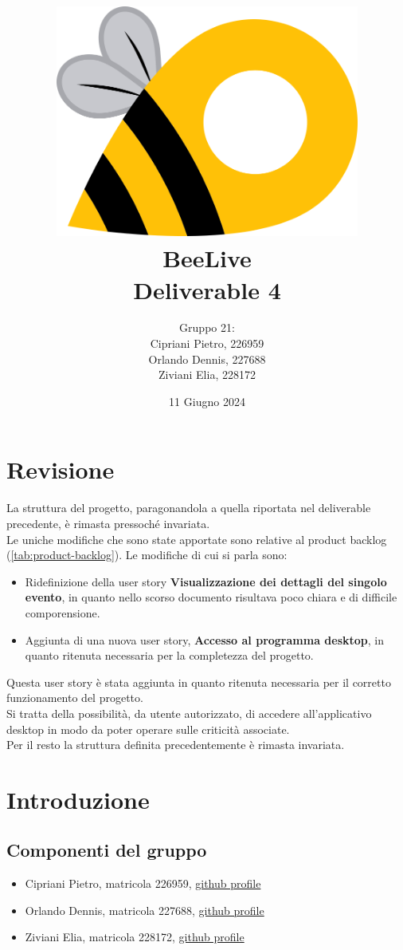 \documentclass{article}
\title{\includegraphics[width=0.75\textwidth]{Images/BeeLive-Logo.png}\\\vspace{100pt}
\LARGE{\textbf{BeeLive\\Deliverable 4}}}
\author{Gruppo 21:\\
Cipriani Pietro, 226959\\
Orlando Dennis, 227688\\
Ziviani Elia, 228172}
\date{11 Giugno 2024}
\begin{document}
\maketitle
\thispagestyle{firstpage} %
\clearpage

\pagestyle{nonplain} %

\renewcommand{\contentsname}{Indice}
\tableofcontents

\clearpage

\section{Revisione}
\label{sec:revisione}
La struttura del progetto, paragonandola a quella riportata nel deliverable precedente, è rimasta pressoché invariata.\\
Le uniche modifiche che sono state apportate sono relative al product backlog (\ref{tab:product-backlog}).
Le modifiche di cui si parla sono:
\begin{itemize}
    \item Ridefinizione della user story \textbf{Visualizzazione dei dettagli del singolo evento}, in quanto nello scorso documento risultava poco chiara e di difficile comporensione.
    \item Aggiunta di una nuova user story, \textbf{Accesso al programma desktop}, in quanto ritenuta necessaria per la completezza del progetto.
\end{itemize}
Questa user story è stata aggiunta in quanto ritenuta necessaria per il corretto funzionamento del progetto.\\
Si tratta della possibilità, da utente autorizzato, di accedere all'applicativo desktop in modo da poter operare sulle criticità associate.\\
Per il resto la struttura definita precedentemente è rimasta invariata.

\clearpage

\section{Introduzione}

\subsection{Componenti del gruppo}
\begin{itemize}
    \item Cipriani Pietro, matricola 226959, \lbrack\href{https://github.com/pietrocipriani}{github profile}\rbrack
    \item Orlando Dennis, matricola 227688, \lbrack\href{https://github.com/dennisorlando}{github profile}\rbrack
    \item Ziviani Elia, matricola 228172, \lbrack\href{https://github.com/ELI20ZIVI}{github profile}\rbrack
\end{itemize}
\end{document}
